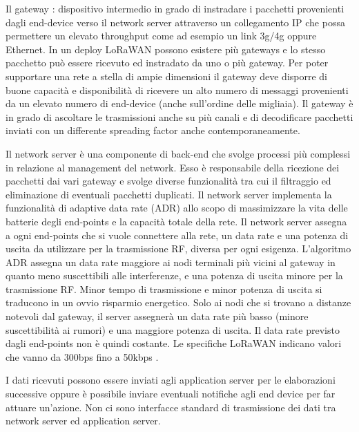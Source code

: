 \documentclass[12pt,a4paper,openright,twoside]{report}
\begin{document}
Il gateway : dispositivo intermedio in grado di instradare i pacchetti provenienti dagli end-device verso il network server attraverso un collegamento IP che possa permettere un elevato throughput come ad esempio un link 3g/4g oppure Ethernet. In un deploy LoRaWAN possono esistere pi\`u gateways e lo stesso pacchetto pu\`o essere ricevuto ed instradato da uno o pi\`u gateway. Per poter supportare una rete a stella di ampie dimensioni il gateway deve disporre di buone capacit\`a e disponibilit\`a di ricevere un alto numero di messaggi provenienti da un elevato numero di end-device (anche sull'ordine delle migliaia). Il gateway \`e in grado di ascoltare le trasmissioni anche su pi\`u canali e di decodificare pacchetti inviati con un differente spreading factor anche contemporaneamente. 

Il network server \`e una componente di back-end che svolge processi pi\`u complessi in relazione al management del network.
Esso \`e responsabile della ricezione dei pacchetti dai vari gateway e svolge diverse funzionalit\`a tra cui il filtraggio ed eliminazione di eventuali pacchetti duplicati. Il network server implementa la funzionalit\`a di adaptive data rate (ADR) allo scopo di massimizzare la vita delle batterie degli end-points e la capacit\`a totale della rete. Il network server assegna a ogni end-points che si vuole connettere alla rete, un data rate e una potenza di uscita da utilizzare per la trasmissione RF, diversa per ogni esigenza. L'algoritmo ADR assegna un data rate maggiore ai nodi terminali pi\`u vicini al gateway in quanto meno suscettibili alle interferenze, e una potenza di uscita minore per la trasmissione RF. Minor tempo di trasmissione e minor potenza di uscita si traducono in un ovvio risparmio energetico. Solo ai nodi che si trovano a distanze notevoli dal gateway, il server assegner\`a un data rate pi\`u basso (minore suscettibilit\`a ai rumori) e una maggiore potenza di uscita. Il data rate previsto dagli end-points non \`e quindi costante. Le specifiche LoRaWAN indicano valori che vanno da 300bps fino a 50kbps \cite{K22}.

I dati ricevuti possono essere inviati agli application server per le elaborazioni successive oppure \`e possibile inviare eventuali notifiche agli end device per far attuare un'azione. Non ci sono interfacce standard di trasmissione dei dati tra network server ed application server.
\end{document}
